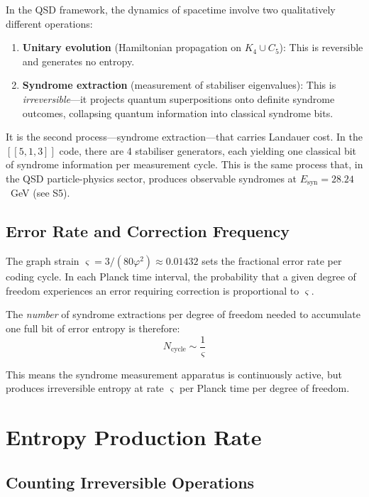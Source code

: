 \documentclass[11pt,a4paper]{article}
\theoremstyle{definition}
\newcommand{\strain}{\varsigma}            %
\newcommand{\Esyn}{E_{\text{syn}}}
\begin{document}
In the QSD framework, the dynamics of spacetime involve two qualitatively different operations:

\begin{enumerate}[nosep]
    \item \textbf{Unitary evolution} (Hamiltonian propagation on $K_4 \cup C_5$): This is reversible and generates no entropy.
    \item \textbf{Syndrome extraction} (measurement of stabiliser eigenvalues): This is \emph{irreversible}---it projects quantum superpositions onto definite syndrome outcomes, collapsing quantum information into classical syndrome bits.
\end{enumerate}

It is the second process---syndrome extraction---that carries Landauer cost. In the $[[5,1,3]]$ code, there are 4 stabiliser generators, each yielding one classical bit of syndrome information per measurement cycle. This is the same process that, in the QSD particle-physics sector, produces observable syndromes at $\Esyn = 28.24$~GeV (see S5).

\subsection{Error Rate and Correction Frequency}

The graph strain $\strain = 3/(80\varphi^2) \approx 0.01432$ sets the fractional error rate per coding cycle. In each Planck time interval, the probability that a given degree of freedom experiences an error requiring correction is proportional to $\strain$.

The \emph{number} of syndrome extractions per degree of freedom needed to accumulate one full bit of error entropy is therefore:
\begin{equation}
    N_{\text{cycle}} \sim \frac{1}{\strain}
\end{equation}

This means the syndrome measurement apparatus is continuously active, but produces irreversible entropy at rate $\strain$ per Planck time per degree of freedom.


\section{Entropy Production Rate}

\subsection{Counting Irreversible Operations}
\end{document}
